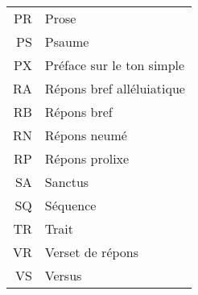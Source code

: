 \documentclass[a5paper]{article}
\begin{document}
\begin{longtable}{r|l}
PR & Prose						 \\
PS & Psaume						 \\
PX & Préface sur le ton simple						 \\
RA & Répons bref alléluiatique						 \\
RB & Répons bref						 \\
RN & Répons neumé						 \\
RP & Répons prolixe						 \\
SA & Sanctus						 \\
SQ & Séquence						 \\
TR & Trait						 \\
VR & Verset de répons			\\
VS & Versus


\end{longtable}
\end{document}
